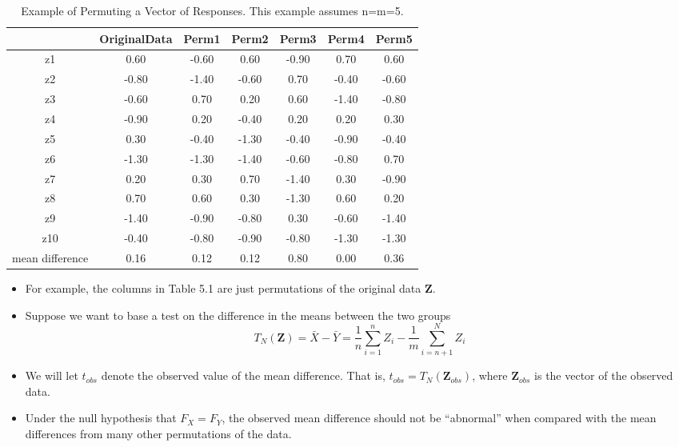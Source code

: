 \documentclass[]{book}
\begin{document}
\begin{table}[ht]
\centering
\begin{tabular}{ccccccc}
  \hline
 & OriginalData & Perm1 & Perm2 & Perm3 & Perm4 & Perm5 \\ 
  \hline
z1 & 0.60 & -0.60 & 0.60 & -0.90 & 0.70 & 0.60 \\ 
  z2 & -0.80 & -1.40 & -0.60 & 0.70 & -0.40 & -0.60 \\ 
  z3 & -0.60 & 0.70 & 0.20 & 0.60 & -1.40 & -0.80 \\ 
  z4 & -0.90 & 0.20 & -0.40 & 0.20 & 0.20 & 0.30 \\ 
  z5 & 0.30 & -0.40 & -1.30 & -0.40 & -0.90 & -0.40 \\ 
  z6 & -1.30 & -1.30 & -1.40 & -0.60 & -0.80 & 0.70 \\ 
  z7 & 0.20 & 0.30 & 0.70 & -1.40 & 0.30 & -0.90 \\ 
  z8 & 0.70 & 0.60 & 0.30 & -1.30 & 0.60 & 0.20 \\ 
  z9 & -1.40 & -0.90 & -0.80 & 0.30 & -0.60 & -1.40 \\ 
  z10 & -0.40 & -0.80 & -0.90 & -0.80 & -1.30 & -1.30 \\ 
  mean difference & 0.16 & 0.12 & 0.12 & 0.80 & 0.00 & 0.36 \\ 
   \hline
\end{tabular}
\caption{Example of Permuting a Vector of Responses.
              This example assumes n=m=5.} 
\end{table}

\begin{itemize}
\item
  For example, the columns in Table 5.1 are just permutations of the original data \(\mathbf{Z}\).
\item
  Suppose we want to base a test on the difference in the means between the two groups
  \begin{equation}
  T_{N}(\mathbf{Z}) = \bar{X} - \bar{Y} = \frac{1}{n}\sum_{i=1}^{n} Z_{i} - \frac{1}{m}\sum_{i=n+1}^{N} Z_{i}
  \end{equation}
\item
  We will let \(t_{obs}\) denote the observed value of the mean difference. That is,
  \(t_{obs} = T_{N}(\mathbf{Z}_{obs})\), where \(\mathbf{Z}_{obs}\) is the vector of the observed data.
\item
  Under the null hypothesis that \(F_{X} = F_{Y}\), the observed mean difference
  should not be ``abnormal'' when compared with the mean differences from
  many other permutations of the data.
\end{itemize}
\end{document}
